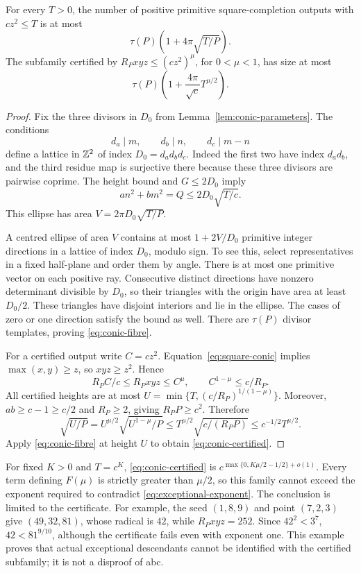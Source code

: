 \begin{theorem}\label{thm:conic-fibre}
For every $T>0$, the number of positive primitive square-completion outputs
with $cz^2\le T$ is at most
\begin{equation}\label{eq:conic-fibre}
 \tau(P)\left(1+4\pi\sqrt{T/P}\right).
\end{equation}
The subfamily certified by $R_Pxyz\le(cz^2)^\mu$, for $0<\mu<1$,
has size at most
\begin{equation}\label{eq:conic-certified}
 \tau(P)\left(1+\frac{4\pi}{\sqrt c}T^{\mu/2}\right).
\end{equation}
\end{theorem}
\begin{proof}
Fix the three divisors in $D_0$ from Lemma~\ref{lem:conic-parameters}.
The conditions
\[
 d_a\mid m,\qquad d_b\mid n,\qquad d_c\mid m-n
\]
define a lattice in $\mathbb Z^2$ of index $D_0=d_ad_bd_c$. Indeed the first
two have index $d_ad_b$, and the third residue map is surjective there
because these three divisors are pairwise coprime.
The height bound and $G\le2D_0$ imply
\[
 an^2+bm^2=Q\le2D_0\sqrt{T/c}.
\]
This ellipse has area $V=2\pi D_0\sqrt{T/P}$.

A centred ellipse of area $V$ contains at most $1+2V/D_0$ primitive
integer directions in a lattice of index $D_0$, modulo sign. To see this,
select representatives in a fixed half-plane and order them by angle.
There is at most one primitive vector on each positive ray. Consecutive
distinct directions have nonzero determinant divisible by $D_0$, so
their triangles with the origin have area at least $D_0/2$.
These triangles have disjoint interiors and lie in the ellipse. The cases
of zero or one direction satisfy the bound as well. There are $\tau(P)$
divisor templates, proving \eqref{eq:conic-fibre}.

For a certified output write $C=cz^2$. Equation~\eqref{eq:square-conic}
implies $\max(x,y)\ge z$, so $xyz\ge z^2$. Hence
\[
 R_PC/c\le R_Pxyz\le C^\mu,\qquad C^{1-\mu}\le c/R_P.
\]
All certified heights are at most
$U=\min\{T,(c/R_P)^{1/(1-\mu)}\}$. Moreover,
$ab\ge c-1\ge c/2$ and $R_P\ge2$, giving $R_PP\ge c^2$. Therefore
\[
 \sqrt{U/P}
 =U^{\mu/2}\sqrt{U^{1-\mu}/P}
 \le T^{\mu/2}\sqrt{c/(R_PP)}
 \le c^{-1/2}T^{\mu/2}.
\]
Apply \eqref{eq:conic-fibre} at height $U$ to obtain
\eqref{eq:conic-certified}.
\end{proof}

For fixed $K>0$ and $T=c^K$, \eqref{eq:conic-certified} is
$c^{\max\{0,K\mu/2-1/2\}+o(1)}$. Every term defining $F(\mu)$ is
strictly greater than $\mu/2$, so this family cannot exceed the exponent
required to contradict \eqref{eq:exceptional-exponent}.
The conclusion is limited to the certificate. For example, the seed
$(1,8,9)$ and point $(7,2,3)$ give $(49,32,81)$, whose radical is $42$,
while $R_Pxyz=252$. Since $42^2<3^7$,
$42<81^{9/10}$, although the certificate fails even with exponent one.
This example proves that actual exceptional descendants cannot be
identified with the certified subfamily; it is not a disproof of abc.
